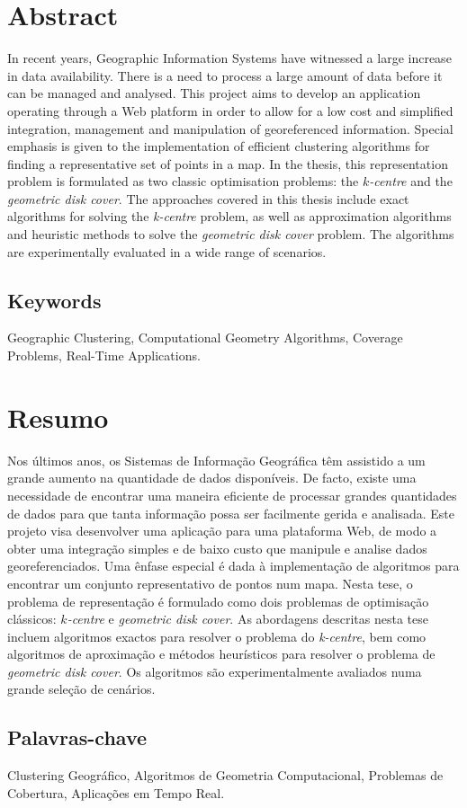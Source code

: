 \setcounter{page}{0}
\vspace*{0.1cm}
\section*{\huge Abstract}

In recent years, Geographic Information Systems have witnessed a large increase in data availability. There is a need to process a large amount of data before it can be managed and analysed. This project aims to develop an application operating through a Web platform in order to allow for a low cost and simplified integration, management and manipulation of georeferenced information. Special emphasis is given to the implementation of efficient clustering algorithms for finding a representative set of points in a map. In the thesis, this representation problem is formulated as two classic optimisation problems: the \emph{$k$-centre} and the \emph{geometric disk cover}. The approaches covered in this thesis include exact algorithms for solving the \emph{k-centre} problem, as well as approximation algorithms and heuristic methods to solve the \emph{geometric disk cover} problem. The algorithms are experimentally evaluated in a wide range of scenarios.

\subsection*{\large Keywords}

Geographic Clustering, Computational Geometry Algorithms, Coverage Problems, Real-Time Applications.

\vspace*{0.6cm}

\section*{\huge Resumo}

Nos últimos anos, os Sistemas de Informação Geográfica têm assistido a um grande aumento na quantidade de dados disponíveis. De facto, existe uma necessidade de encontrar uma maneira eficiente de processar grandes quantidades de dados para que tanta informação possa ser facilmente gerida e analisada. Este projeto visa desenvolver uma aplicação para uma plataforma Web, de modo a obter uma integração simples e de baixo custo que manipule e analise dados georeferenciados. Uma ênfase especial é dada à implementação de algoritmos para encontrar um conjunto representativo de pontos num mapa. Nesta tese, o problema de representação é formulado como dois problemas de optimisação clássicos: \emph{$k$-centre} e \emph{geometric disk cover}. As abordagens descritas nesta tese incluem algoritmos exactos para resolver o problema do \emph{k-centre}, bem como algoritmos de aproximação e métodos heurísticos para resolver o problema de \emph{geometric disk cover}. Os algoritmos são experimentalmente avaliados numa grande seleção de cenários.

\subsection*{Palavras-chave}

Clustering Geográfico, Algoritmos de Geometria Computacional, Problemas de Cobertura, Aplicações em Tempo Real.

\vfill